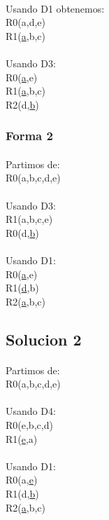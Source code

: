 \documentclass[a4paper,10pt]{article}
\begin{document}
\paragraph{}Usando D1 obtenemos:\\
R0(a,d,e)\\
R1(\underline{a},b,c)
\paragraph{}Usando D3:\\
R0(\underline{a},e)\\
R1(\underline{a},b,c)\\
R2(d,\underline{b})
\pagebreak
\subsubsection{Forma 2}
\paragraph{}Partimos de:\\
R0(a,b,c,d,e)
\paragraph{}Usando D3:\\
R1(a,b,c,e)\\
R0(d,\underline{b})
\paragraph{}Usando D1:\\
R0(\underline{a},e)\\
R1(\underline{d},b)\\
R2(\underline{a},b,c)
\subsection{Solucion 2}
\paragraph{}Partimos de:\\
R0(a,b,c,d,e)
\paragraph{}Usando D4:\\
R0(e,b,c,d)\\
R1(\underline{e},a)
\paragraph{}Usando D1:\\
R0(a,\underline{e})\\
R1(d,\underline{b})\\
R2(\underline{a},b,c)
\end{document}

